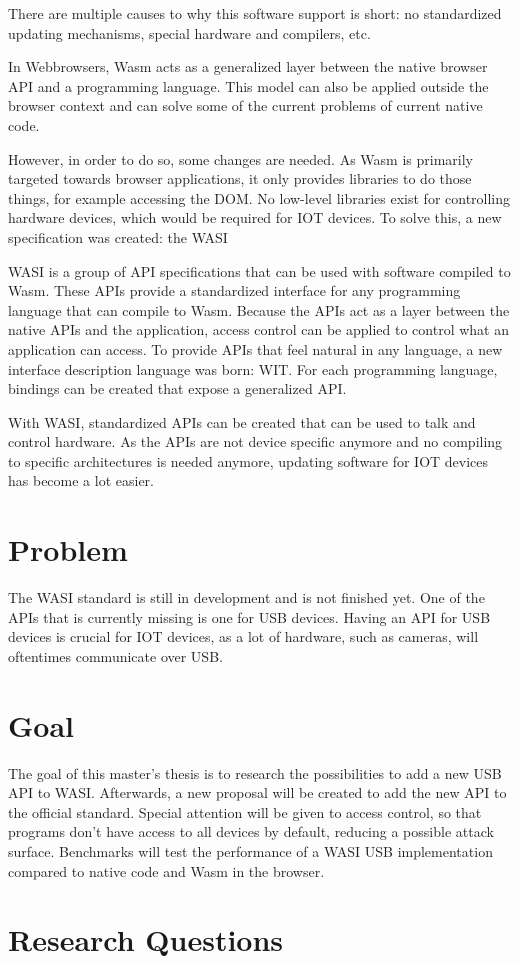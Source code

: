 There are multiple causes to why this software support is short: no standardized updating mechanisms, special hardware and compilers, etc.

In Webbrowsers, \acrfull{Wasm} acts as a generalized layer between the native browser API and a programming language. This model can also be applied outside the browser context and can solve some of the current problems of current native code.

However, in order to do so, some changes are needed. As \acrshort{Wasm} is primarily targeted towards browser applications, it only provides libraries to do those things, for example accessing the DOM. No low-level libraries exist for controlling hardware devices, which would be required for IOT devices. To solve this, a new specification was created: the \acrfull{WASI}

\acrshort{WASI} is a group of API specifications that can be used with software compiled to \acrshort{Wasm}. These APIs provide a standardized interface for any programming language that can compile to \acrshort{Wasm}. Because the APIs act as a layer between the native APIs and the application, access control can be applied to control what an application can access. To provide APIs that feel natural in any language, a new interface description language was born: \acrfull{WIT}. For each programming language, bindings can be created that expose a generalized API.

With \acrshort{WASI}, standardized APIs can be created that can be used to talk and control hardware. As the APIs are not device specific anymore and no compiling to specific architectures is needed anymore, updating software for IOT devices has become a lot easier.

\section*{Problem}

The \acrshort{WASI} standard is still in development and is not finished yet. One of the APIs that is currently missing is one for USB devices. Having an API for USB devices is crucial for IOT devices, as a lot of hardware, such as cameras, will oftentimes communicate over USB.

\section*{Goal}

The goal of this master's thesis is to research the possibilities to add a new USB API to WASI. Afterwards, a new proposal will be created to add the new API to the official standard. Special attention will be given to access control, so that programs don't have access to all devices by default, reducing a possible attack surface. Benchmarks will test the performance of a WASI USB implementation compared to native code and Wasm in the browser.

\section*{Research Questions}





